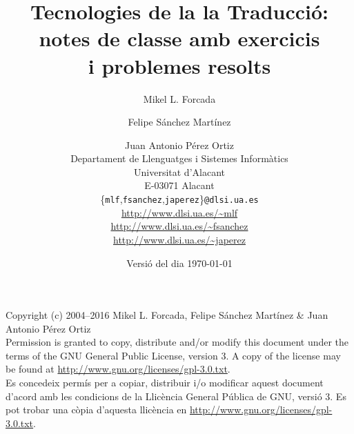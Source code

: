 \documentclass[11pt,a4paper]{book}
\newcommand{\com}[1]{\begin{quote}{\small\sf #1}\end{quote}}
\renewcommand{\com}[1]{}
\begin{document}
\frontmatter

\title{Tecnologies de la la Traducció: \\ notes de classe 
amb exercicis\\ i problemes resolts}
\author{Mikel L. Forcada \and Felipe Sánchez Martínez \and Juan Antonio Pérez Ortiz\\[2ex]
Departament de Llenguatges i Sistemes Informàtics\\
Universitat d'Alacant\\
E-03071 Alacant\\[2ex]
\{\texttt{mlf},\texttt{fsanchez},\texttt{japerez}\}\texttt{@dlsi.ua.es} \\[2ex]
\url{http://www.dlsi.ua.es/~mlf} \\
\url{http://www.dlsi.ua.es/~fsanchez} \\
\url{http://www.dlsi.ua.es/~japerez}
}
\date{Versió del dia \today}
\maketitle
\newpage
\noindent Copyright (c) 2004--2016 Mikel L. Forcada, Felipe Sánchez Martínez \& Juan Antonio Pérez Ortiz \\[0.3cm]

\noindent Permission is granted to copy, distribute and/or modify this
document under the terms of the GNU General Public License, version 3.
A copy of the license may be found at \url{http://www.gnu.org/licenses/gpl-3.0.txt}. \\[0.3cm]

\noindent Es concedeix permís per a copiar, distribuir i/o modificar
aquest document d'acord amb les condicions de la Llicència General
Pública de GNU, versió 3. Es pot trobar una còpia d'aquesta llicència
en \url{http://www.gnu.org/licenses/gpl-3.0.txt}.  

\maketitle

\tableofcontents
\newpage

\mainmatter

\com{Lista (incompleta) de coses a fer:
  \begin{itemize}
  \item Integrar problemes resolts d'examens de prova i exercicis dels
    tests.
  \item Integrar anotacions de la llibreta de classe de 2002--2003
    (algunes ja integrades).
  \item Aprofitar material de transparències de màsters, etc. (alguns
    ja ficats).
  \item Citar els capítols corresponents del nou llibre de Somers.
  \item Revisar el llibre repassant la llista d'objectius del curs.
  \end{itemize}
}
\end{document}

